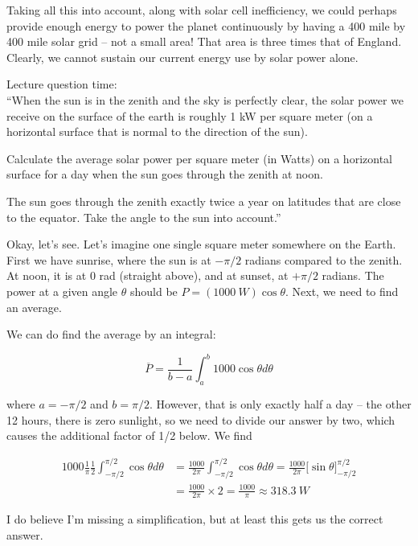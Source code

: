Taking all this into account, along with solar cell inefficiency, we could perhaps provide enough energy to power the planet continuously by having a 400 mile by 400 mile solar grid -- not a small area! That area is three times that of England. Clearly, we cannot sustain our current energy use by solar power alone.

Lecture question time:\\
``When the sun is in the zenith and the sky is perfectly clear, the solar power we receive on the surface of the earth is roughly 1 kW per square meter (on a horizontal surface that is normal to the direction of the sun).

Calculate the average solar power per square meter (in Watts) on a horizontal surface for a day when the sun goes through the zenith at noon.

The sun goes through the zenith exactly twice a year on latitudes that are close to the equator. Take the angle to the sun into account.''

Okay, let's see. Let's imagine one single square meter somewhere on the Earth. First we have sunrise, where the sun is at $-\pi/2$ radians compared to the zenith. At noon, it is at 0 rad (straight above), and at sunset, at $+\pi/2$ radians. The power at a given angle $\theta$ should be $P = (\SI{1000}{W})\cos\theta$. Next, we need to find an average.

We can do find the average by an integral:

\begin{equation}
\overbar{P} = \frac{1}{b - a} \int_a^b 1000 \cos \theta d \theta
\end{equation}

where $a = -\pi/2$ and $b = \pi/2$. However, that is only exactly half a day -- the other 12 hours, there is zero sunlight, so we need to divide our answer by two, which causes the additional factor of 1/2 below. We find

\begin{align}
1000 \frac{1}{\pi} \frac{1}{2} \int_{-\pi/2}^{\pi/2} \cos \theta d \theta &= \frac{1000}{2 \pi} \int_{-\pi/2}^{\pi/2} \cos \theta d \theta = \frac{1000}{2\pi} \Big[ \sin \theta \Big]_{-\pi/2}^{\pi/2}\\
                                                              &= \frac{1000}{2\pi} \times 2 = \frac{1000}{\pi} \approx \SI{318.3}{W}
\end{align}

I do believe I'm missing a simplification, but at least this gets us the correct answer.

